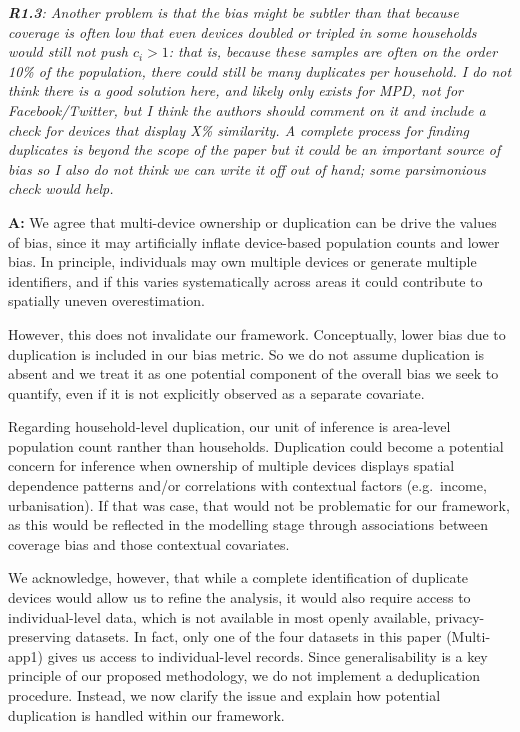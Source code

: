 \documentclass[
  letterpaper,
  DIV=11,
  numbers=noendperiod]{scrartcl}
\begin{document}
\setlength{\leftskip}{0cm}\textit{\textbf{R1.3}: Another problem is that the bias might be subtler than that because coverage is often low that even devices doubled or tripled in some households would still not push $c_i > 1$: that is, because these samples are often on the order 10\% of the population, there could still be many duplicates per household. I do not think there is a good solution here, and likely only exists for MPD, not for Facebook/Twitter, but I think the authors should comment on it and include a check for devices that display X\% similarity. A complete process for finding duplicates is beyond the scope of the paper but it could be an important source of bias so I also do not think we can write it off out of hand; some parsimonious check would help.}

\setlength{\leftskip}{0.5cm}\textbf{A:} We agree that multi-device
ownership or duplication can be drive the values of bias, since it may
artificially inflate device-based population counts and lower bias. In
principle, individuals may own multiple devices or generate multiple
identifiers, and if this varies systematically across areas it could
contribute to spatially uneven overestimation.

However, this does not invalidate our framework. Conceptually, lower
bias due to duplication is included in our bias metric. So we do not
assume duplication is absent and we treat it as one potential component
of the overall bias we seek to quantify, even if it is not explicitly
observed as a separate covariate.

Regarding household-level duplication, our unit of inference is
area-level population count ranther than households. Duplication could
become a potential concern for inference when ownership of multiple
devices displays spatial dependence patterns and/or correlations with
contextual factors (e.g.~income, urbanisation). If that was case, that
would not be problematic for our framework, as this would be reflected
in the modelling stage through associations between coverage bias and
those contextual covariates.

We acknowledge, however, that while a complete identification of
duplicate devices would allow us to refine the analysis, it would also
require access to individual-level data, which is not available in most
openly available, privacy-preserving datasets. In fact, only one of the
four datasets in this paper (Multi-app1) gives us access to
individual-level records. Since generalisability is a key principle of
our proposed methodology, we do not implement a deduplication procedure.
Instead, we now clarify the issue and explain how potential duplication
is handled within our framework.
\end{document}
